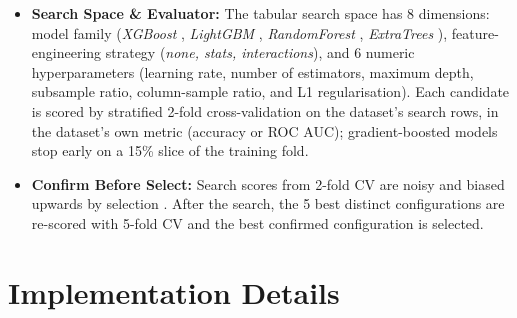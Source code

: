 \documentclass[11pt, a4paper]{article}
\begin{document}
\begin{itemize}[noitemsep, topsep=2pt]
\begin{itemize}[noitemsep]
        \item \textit{Tier 2 (Working Exploitation):} The two families with the highest UCB scores after the tournament are promoted; each takes one reserve group. At every checkpoint the two Tier 2 islands trade elites pairwise (each one's worst 20\% replaced by the other's best 20\%). Stagnant islands receive random members through the optimizer's \texttt{inject} method: 50\% at once in Tier 1, 20\% after three stagnant checkpoints in Tier 2.
        \item \textit{Dynamic SWAP \& Rollback:} If the best Tier 1 family's UCB score exceeds the weaker Tier 2 family's by more than an additive margin of 0.10, the two are swapped. If the promoted family does not improve the global best within a 5-iteration grace period, the swap is rolled back from a saved snapshot. Every promotion, swap, rollback, injection and elite exchange is recorded in the run's decision log.
    \end{itemize}
    \item \textbf{Search Space \& Evaluator:} The tabular search space has 8 dimensions: model family (\textit{XGBoost} \cite{chen2016xgboost}, \textit{LightGBM} \cite{ke2017lightgbm}, \textit{RandomForest} \cite{breiman2001random}, \textit{ExtraTrees} \cite{geurts2006extremely}), feature-engineering strategy (\textit{none, stats, interactions}), and 6 numeric hyperparameters (learning rate, number of estimators, maximum depth, subsample ratio, column-sample ratio, and L1 regularisation). Each candidate is scored by stratified 2-fold cross-validation on the dataset's search rows, in the dataset's own metric (accuracy or ROC AUC); gradient-boosted models stop early on a 15\% slice of the training fold.
    \item \textbf{Confirm Before Select:} Search scores from 2-fold CV are noisy and biased upwards by selection \cite{schneider2025overtuning, nagler2024reshuffling}. After the search, the 5 best distinct configurations are re-scored with 5-fold CV and the best confirmed configuration is selected.
\end{itemize}

\section{Implementation Details}
\end{document}
